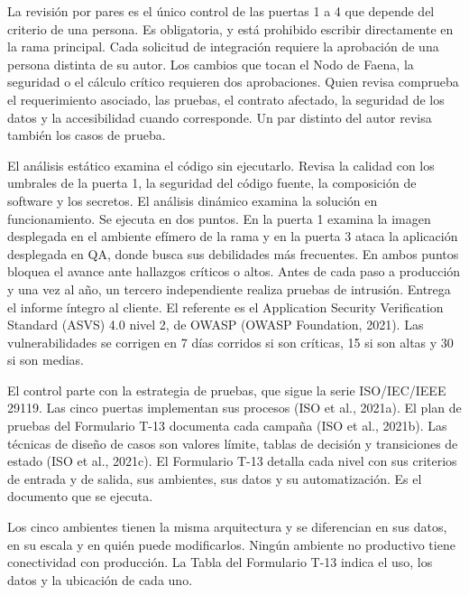\documentclass[subdoc]{../../comun/overfore}
\begin{document}
La revisión por pares es el único control de las puertas 1 a 4 que depende del criterio de una persona. Es obligatoria, y está prohibido escribir directamente en la rama principal. Cada solicitud de integración requiere la aprobación de una persona distinta de su autor. Los cambios que tocan el Nodo de Faena, la seguridad o el cálculo crítico requieren dos aprobaciones. Quien revisa comprueba el requerimiento asociado, las pruebas, el contrato afectado, la seguridad de los datos y la accesibilidad cuando corresponde. Un par distinto del autor revisa también los casos de prueba.

El análisis estático examina el código sin ejecutarlo. Revisa la calidad con los umbrales de la puerta 1, la seguridad del código fuente, la composición de software y los secretos. El análisis dinámico examina la solución en funcionamiento. Se ejecuta en dos puntos. En la puerta 1 examina la imagen desplegada en el ambiente efímero de la rama y en la puerta 3 ataca la aplicación desplegada en QA, donde busca sus debilidades más frecuentes. En ambos puntos bloquea el avance ante hallazgos críticos o altos. Antes de cada paso a producción y una vez al año, un tercero independiente realiza pruebas de intrusión. Entrega el informe íntegro al cliente. El referente es el Application Security Verification Standard (ASVS) 4.0 nivel 2, de OWASP (OWASP Foundation, 2021). Las vulnerabilidades se corrigen en 7 días corridos si son críticas, 15 si son altas y 30 si son medias.

El control parte con la estrategia de pruebas, que sigue la serie ISO/IEC/IEEE 29119. Las cinco puertas implementan sus procesos (ISO et al., 2021a). El plan de pruebas del Formulario T-13 documenta cada campaña (ISO et al., 2021b). Las técnicas de diseño de casos son valores límite, tablas de decisión y transiciones de estado (ISO et al., 2021c). El Formulario T-13 detalla cada nivel con sus criterios de entrada y de salida, sus ambientes, sus datos y su automatización. Es el documento que se ejecuta.

Los cinco ambientes tienen la misma arquitectura y se diferencian en sus datos, en su escala y en quién puede modificarlos. Ningún ambiente no productivo tiene conectividad con producción. La Tabla  del Formulario T-13 indica el uso, los datos y la ubicación de cada uno.
\end{document}
